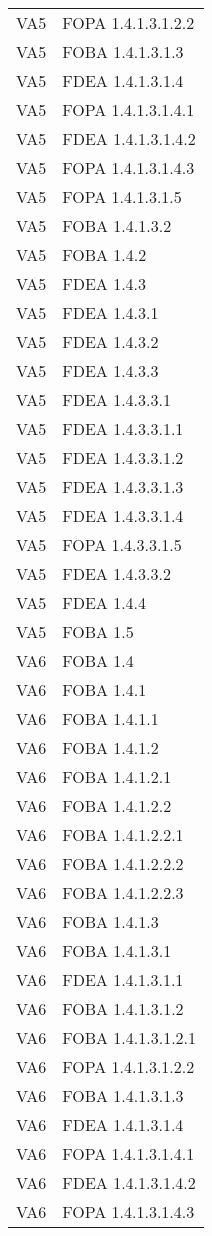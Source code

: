 \begin{longtable}{XX}
VA5&FOPA 1.4.1.3.1.2.2\\ 
VA5&FOBA 1.4.1.3.1.3\\ 
VA5&FDEA 1.4.1.3.1.4\\ 
VA5&FOPA 1.4.1.3.1.4.1\\ 
VA5&FDEA 1.4.1.3.1.4.2\\ 
VA5&FOPA 1.4.1.3.1.4.3\\ 
VA5&FOPA 1.4.1.3.1.5\\ 
VA5&FOBA 1.4.1.3.2\\ 
VA5&FOBA 1.4.2\\ 
VA5&FDEA 1.4.3\\ 
VA5&FDEA 1.4.3.1\\ 
VA5&FDEA 1.4.3.2\\ 
VA5&FDEA 1.4.3.3\\ 
VA5&FDEA 1.4.3.3.1\\ 
VA5&FDEA 1.4.3.3.1.1\\ 
VA5&FDEA 1.4.3.3.1.2\\ 
VA5&FDEA 1.4.3.3.1.3\\ 
VA5&FDEA 1.4.3.3.1.4\\ 
VA5&FOPA 1.4.3.3.1.5\\ 
VA5&FDEA 1.4.3.3.2\\ 
VA5&FDEA 1.4.4\\ 
VA5&FOBA 1.5\\ 
\midrule 
VA6&FOBA 1.4\\ 
VA6&FOBA 1.4.1\\ 
VA6&FOBA 1.4.1.1\\ 
VA6&FOBA 1.4.1.2\\ 
VA6&FOBA 1.4.1.2.1\\ 
VA6&FOBA 1.4.1.2.2\\ 
VA6&FOBA 1.4.1.2.2.1\\ 
VA6&FOBA 1.4.1.2.2.2\\ 
VA6&FOBA 1.4.1.2.2.3\\ 
VA6&FOBA 1.4.1.3\\ 
VA6&FOBA 1.4.1.3.1\\ 
VA6&FDEA 1.4.1.3.1.1\\ 
VA6&FOBA 1.4.1.3.1.2\\ 
VA6&FOBA 1.4.1.3.1.2.1\\ 
VA6&FOPA 1.4.1.3.1.2.2\\ 
VA6&FOBA 1.4.1.3.1.3\\ 
VA6&FDEA 1.4.1.3.1.4\\ 
VA6&FOPA 1.4.1.3.1.4.1\\ 
VA6&FDEA 1.4.1.3.1.4.2\\ 
VA6&FOPA 1.4.1.3.1.4.3\\ 

\end{longtable}
